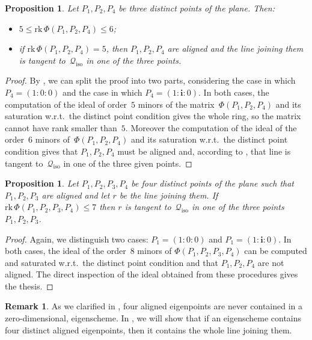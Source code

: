 \documentclass{amsart}
\theoremstyle{plain}
\newtheorem{prop}[lemma]{Proposition}
\theoremstyle{definition}
\newtheorem{rmk}[lemma]{Remark}
\newcommand{\iso}{\mathcal{Q}_{\mathrm{iso}}}
\newcommand{\iii}{\textbf{i}}
\newcommand{\rk}{\ensuremath{\mathrm{rk}}}
\begin{document}
\begin{prop}
\label{manca il riferimento su ancillary  non e': condition_rank_aligned}
Let $P_1, P_2, P_4$ be three distinct points of the plane. Then:
%
\begin{itemize}
  \item $5 \leq \rk \,\Phi(P_1, P_2, P_4) \leq 6$;
  \item if
  $\rk \,\Phi(P_1, P_2, P_4) = 5$, then $P_1, P_2, P_4$
  are aligned and the line joining them is tangent to~$\iso$
  in one of the three points.
\end{itemize}
%
\end{prop}
\begin{proof}
By , we can split the proof into two parts, considering the case in
which $P_4 = (1: 0: 0)$ and the case in which $P_4 = (1: \iii: 0)$.
In both cases, the computation of the ideal of order~$5$ minors of the matrix~$\Phi(P_1, P_2, P_4)$ and its saturation w.r.t.\ the distinct point condition gives the whole ring, so the matrix cannot have rank smaller than~$5$.
Moreover the computation
of the ideal of the order~$6$ minors of~$\Phi(P_1, P_2, P_4)$ and its
saturation w.r.t.\ the distinct point condition gives that
$P_1, P_2, P_4$ must be aligned and, according to ,
that line is tangent to~$\iso$ in one of the three given points.
\end{proof}

\begin{prop}
\label{prop:condition3+1}
Let $P_1, P_2, P_3, P_4$ be four distinct points of the plane such that
$P_1, P_2, P_3$ are aligned and let $r$ be the line joining them.
If $\rk \,\Phi(P_1, P_2, P_3, P_4) \leq 7$ then $r$ is tangent to~$\iso$ in one of the three points $P_1, P_2, P_3$.
\end{prop}
\begin{proof}
Again, we distinguish two cases: $P_1 = (1: 0: 0)$ and
$P_1 = (1: \iii: 0)$. In both cases, the ideal of the order~$8$
minors of $\Phi(P_1, P_2, P_3, P_4)$ can be computed and saturated
w.r.t.\ the distinct point condition and that
$P_1, P_2, P_4$ are not aligned.
The direct inspection of the ideal obtained from these procedures gives the thesis.
\end{proof}

\begin{rmk}
As we clarified in , four aligned eigenpoints are never contained in a zero-dimensional, eigenscheme.
In , we will show that if an eigenscheme contains four distinct aligned eigenpoints, then it contains the whole line joining them.
\end{rmk}
\end{document}
